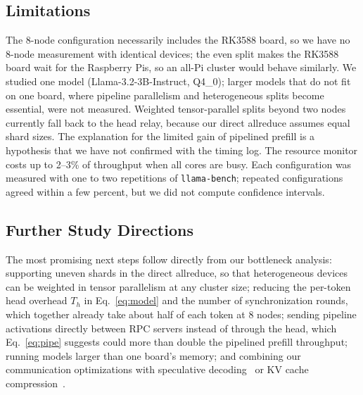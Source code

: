 \documentclass[11pt,a4paper]{article}
\begin{document}
\subsection{Limitations}\label{sec:n9_2}
The 8-node configuration necessarily includes the RK3588 board, so we have no 8-node measurement with identical devices; the even split makes the RK3588 board wait for the Raspberry Pis, so an all-Pi cluster would behave similarly. We studied one model (Llama-3.2-3B-Instruct, Q4\_0); larger models that do not fit on one board, where pipeline parallelism and heterogeneous splits become essential, were not measured. Weighted tensor-parallel splits beyond two nodes currently fall back to the head relay, because our direct allreduce assumes equal shard sizes. The explanation for the limited gain of pipelined prefill is a hypothesis that we have not confirmed with the timing log. The resource monitor costs up to 2--3\% of throughput when all cores are busy. Each configuration was measured with one to two repetitions of \texttt{llama-bench}; repeated configurations agreed within a few percent, but we did not compute confidence intervals.

\subsection{Further Study Directions}\label{sec:n9_3}
The most promising next steps follow directly from our bottleneck analysis: supporting uneven shards in the direct allreduce, so that heterogeneous devices can be weighted in tensor parallelism at any cluster size; reducing the per-token head overhead $T_h$ in Eq.~\ref{eq:model} and the number of synchronization rounds, which together already take about half of each token at 8 nodes; sending pipeline activations directly between RPC servers instead of through the head, which Eq.~\ref{eq:pipe} suggests could more than double the pipelined prefill throughput; running models larger than one board's memory; and combining our communication optimizations with speculative decoding~\cite{leviathan2023fast} or KV cache compression~\cite{li2024surveykv}.
\end{document}
